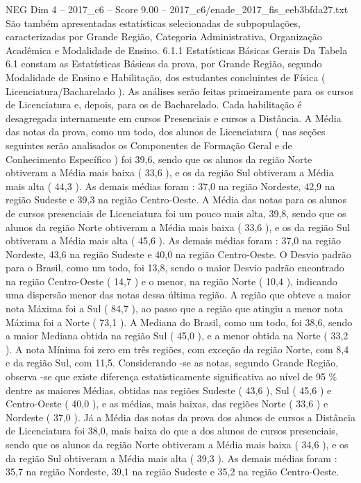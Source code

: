 \begin{textsample}{NEG Dim 4 – 2017\_c6 – Score 9.00 – 2017\_c6/enade\_2017\_fis\_eeb3bfda27.txt}
São também apresentadas estatísticas selecionadas de subpopulações, caracterizadas por Grande Região, Categoria Administrativa, Organização Acadêmica e Modalidade de Ensino. 6.1.1 Estatísticas Básicas Gerais Da Tabela 6.1 constam as Estatísticas Básicas da prova, por Grande Região, segundo Modalidade de Ensino e Habilitação, dos estudantes concluintes de Física ( Licenciatura/Bacharelado ).
As análises serão feitas primeiramente para os cursos de Licenciatura e, depois, para os de Bacharelado.
Cada habilitação é desagregada internamente em cursos Presenciais e cursos a Distância.
A Média das notas da prova, como um todo, dos alunos de Licenciatura ( nas seções seguintes serão analisados os Componentes de Formação Geral e de Conhecimento Específico ) foi 39,6, sendo que os alunos da região Norte obtiveram a Média mais baixa ( 33,6 ), e os da região Sul obtiveram a Média mais alta ( 44,3 ).
As demais médias foram : 37,0 na região Nordeste, 42,9 na região Sudeste e 39,3 na região Centro-Oeste.
A Média das notas para os alunos de cursos presenciais de Licenciatura foi um pouco mais alta, 39,8, sendo que os alunos da região Norte obtiveram a Média mais baixa ( 33,6 ), e os da região Sul obtiveram a Média mais alta ( 45,6 ).
As demais médias foram : 37,0 na região Nordeste, 43,6 na região Sudeste e 40,0 na região Centro-Oeste.
O Desvio padrão para o Brasil, como um todo, foi 13,8, sendo o maior Desvio padrão encontrado na região Centro-Oeste ( 14,7 ) e o menor, na região Norte ( 10,4 ), indicando uma dispersão menor das notas dessa última região.
A região que obteve a maior nota Máxima foi a Sul ( 84,7 ), ao passo que a região que atingiu a menor nota Máxima foi a Norte ( 73,1 ).
A Mediana do Brasil, como um todo, foi 38,6, sendo a maior Mediana obtida na região Sul ( 45,0 ), e a menor obtida na Norte ( 33,2 ).
A nota Mínima foi zero em três regiões, com exceção da região Norte, com 8,4 e da região Sul, com 11,5.
Considerando -se as notas, segundo Grande Região, observa -se que existe diferença estatisticamente significativa ao nível de 95 \% dentre as maiores Médias, obtidas nas regiões Sudeste ( 43,6 ), Sul ( 45,6 ) e Centro-Oeste ( 40,0 ), e as médias, mais baixas, das regiões Norte ( 33,6 ) e Nordeste ( 37,0 ).
Já a Média das notas da prova dos alunos de cursos a Distância de Licenciatura foi 38,0, mais baixa do que a dos alunos de cursos presenciais, sendo que os alunos da região Norte obtiveram a Média mais baixa ( 34,6 ), e os da região Sul obtiveram a Média mais alta ( 39,3 ).
As demais médias foram : 35,7 na região Nordeste, 39,1 na região Sudeste e 35,2 na região Centro-Oeste.

\end{textsample}
